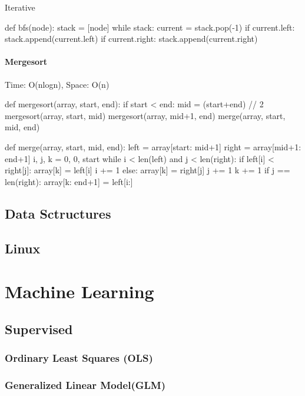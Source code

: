 \documentclass[11pt]{article}
\begin{document}
Iterative \\
\begin{python}
def bfs(node):
    stack = [node]
    while stack:
        current = stack.pop(-1)
        if current.left:
            stack.append(current.left)
        if current.right:
            stack.append(current.right)
\end{python}

\paragraph{Mergesort} Time: O(nlogn), Space: O(n)

\begin{python}
def mergesort(array, start, end):
    if start < end:
        mid = (start+end) // 2
        mergesort(array, start, mid)
        mergesort(array, mid+1, end)
        merge(array, start, mid, end)
\end{python}

\begin{python}
def merge(array, start, mid, end):
    left = array[start: mid+1]
    right = array[mid+1: end+1]
    i, j, k = 0, 0, start
    while i < len(left) and j < len(right):
        if left[i] < right[j]:
            array[k] = left[i]
            i += 1
        else:
            array[k] = right[j]
            j += 1
        k += 1
    if j == len(right):
        array[k: end+1] = left[i:]
\end{python}

\subsection{Data Sctructures}

\subsection{Linux}

\section{Machine Learning}
\subsection{Supervised}
\subsubsection{Ordinary Least Squares (OLS)}
\subsubsection{Generalized Linear Model(GLM)}
\end{document}
